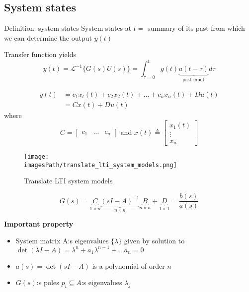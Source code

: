 \subsection{System states}
\begin{definitionblock}{Definition: system states}
   System states at $t=$ summary of its past from which we can determine the output $y(t)$ 

   Transfer function yields 
   \begin{equation*}
       y(t) = \mathcal{L}^{-1}\{ G(s)U(s) \} = \int_{\tau=0}^{t} g(t)\underbrace{u(t-\tau)}_\text{past input} d\tau
   \end{equation*}

   \begin{align*}
       y(t) &= c_1x_t(t) + c_2x_2(t) + \ldots + c_nx_n(t) + Du(t) \\
       &= Cx(t) + Du(t)
   \end{align*}
   where
   \begin{equation*}
       C = \begin{bmatrix} c_1 & \ldots & c_n \end{bmatrix}
        \text{ and } 
        x(t) \triangleq \begin{bmatrix} x_{1}(t) \\ \vdots \\ x_{n} \end{bmatrix}
   \end{equation*}
\end{definitionblock}

\begin{figure}[!h]
    \centering
    \texttt{[image: \\imagesPath/translate\_lti\_system\_models.png]}
    \caption{Translate LTI system models}
\end{figure}

\begin{equation*}
    G(s) = \underbrace{C}_{1\times n}\underbrace{(sI-A)^{-1}}_{n\times n}
    \underbrace{B}_{n\times n} + \underbrace{D}_{1\times 1} = \frac{b(s)}{a(s)}
\end{equation*}

\textbf{Important property}
\begin{itemize}
    \item System matrix A:s eigenvalues $\{\lambda\}$ given by solution to 
    $\det(\lambda I - A) = \lambda^n + a_1\lambda^{n-1} + \ldots a_n = 0$
    \item $a(s) = \det(sI - A)$ is a polynomial of order $n$
    \item $G(s)$:s poles $p_i \subseteq A$:s eigenvalues $\lambda_j$
\end{itemize}

